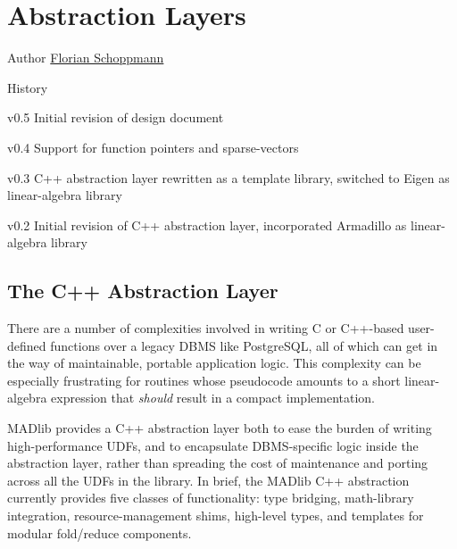 
\chapter{Abstraction Layers}

\begin{moduleinfo}
\item[Author] \href{mailto:Florian.Schoppmann@emc.com}{Florian Schoppmann}
\item[History]
	\begin{modulehistory}
		\item[v0.5] Initial revision of design document
		\item[v0.4] Support for function pointers and sparse-vectors
		\item[v0.3] C++ abstraction layer rewritten as a template library, switched to Eigen \cite{eigen} as linear-algebra library
		\item[v0.2] Initial revision of C++ abstraction layer, incorporated Armadillo \cite{armadillo} as linear-algebra library
	\end{modulehistory}
\end{moduleinfo}


\section{The C++ Abstraction Layer}

There are a number of complexities involved in writing C or C++-based user-defined functions over a legacy DBMS like PostgreSQL, all of which can get in the way of maintainable, portable application logic. This complexity can be especially frustrating for routines whose pseudocode amounts to a short linear-algebra expression that \emph{should} result in a compact implementation.

MADlib provides a C++ abstraction layer both to ease the burden of writing high-performance UDFs, and to encapsulate DBMS-specific logic inside the abstraction layer, rather than spreading the cost of maintenance and porting across all the UDFs in the library. In brief, the MADlib C++ abstraction currently provides five classes of functionality: type bridging, math-library integration, resource-management shims, high-level types, and templates for modular fold/reduce components.

